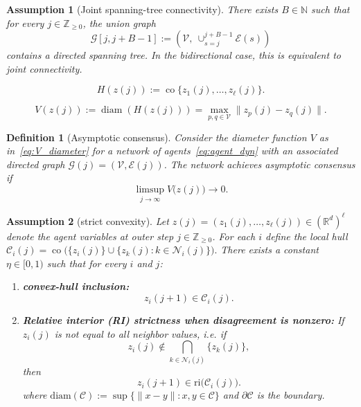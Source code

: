 \documentclass[10pt,a4paper]{amsart}
\newtheorem{assumption}{Assumption}
\newtheorem{definition}{Definition}
\def\Cij{\mathcal{C}_i (j)}
\def\Z{\field{Z}}%
\newcommand{\Zp}{\Z_{\geq 0}}
\def\field#1{\mathbb #1}%
\def\ri{\mathrm{ri}}
\begin{document}
\begin{assumption}[Joint spanning-tree connectivity]\label{ass:joint_tree}
There exists $B\in\mathbb{N}$ such that for every $j \in \Zp$, the union graph
\[
\mathcal{G}[j,j+B-1] := (\mathcal{V},\ \cup_{s=j}^{j+B-1}\mathcal{E}(s))
\]
contains a directed spanning tree. In the bidirectional case, this is equivalent to joint connectivity.
\end{assumption}

\begin{equation}\label{eq:H_def_moreau}
H(z(j)):=\operatorname{co}\{z_1(j),\dots,z_\ell(j)\}.
\end{equation}

\begin{equation}\label{eq:V_diameter}
V(z(j)):=\operatorname{diam}(H(z(j)))=\max_{p,q\in\mathcal{V}}\|z_p(j)-z_q(j)\|.
\end{equation}

\begin{definition}[Asymptotic consensus]\label{def:asymp_consensus}
Consider the diameter function $V$ as in~\eqref{eq:V_diameter} for a network of agents~\eqref{eq:agent_dyn} with an associated directed graph
$\mathcal{G}(j)=(\mathcal{V},\mathcal{E}(j))$.
The network achieves asymptotic consensus if 
\[
\limsup_{j\to\infty} V\big(z(j)\big) \to 0 .
\]
\end{definition}

\begin{assumption}[strict convexity]
\label{ass:asymp_moreau_A1}
Let $z(j)=(z_1(j),\dots,z_\ell(j))\in(\mathbb R^d)^\ell$ denote the agent variables at outer step $j\in\mathbb Z_{\ge0}$.
For each $i$ define the local hull
$
\Cij=\operatorname{co}\big(\{z_i(j)\}\cup\{z_k(j):k\in\mathcal N_i(j)\}\big).
$
There exists a constant $\eta\in[0,1)$ such that for every $i$ and $j$:
\begin{enumerate}
\item \textbf{convex-hull inclusion:}
\begin{equation}
z_i(j+1)\in \Cij .
\label{eq:A1a_eps_hull}
\end{equation}
\item \textbf{Relative interior (RI) strictness when disagreement is nonzero:}
If $z_i(j)$ is not equal to all neighbor values, i.e. if
\[
z_i(j)\notin \bigcap_{k\in\mathcal N_i(j)}\{z_k(j)\},
\]
then
\begin{equation}
z_i(j+1)\in \ri\big(\Cij\big).
\label{eq:A1b_ri_strictness}
\end{equation}
where $\mathrm{diam}(\mathcal C):=\sup\{\|x-y\|:x,y\in\mathcal C\}$ and $\partial \mathcal C$ is the boundary.
\end{enumerate}
\end{assumption}
\end{document}

